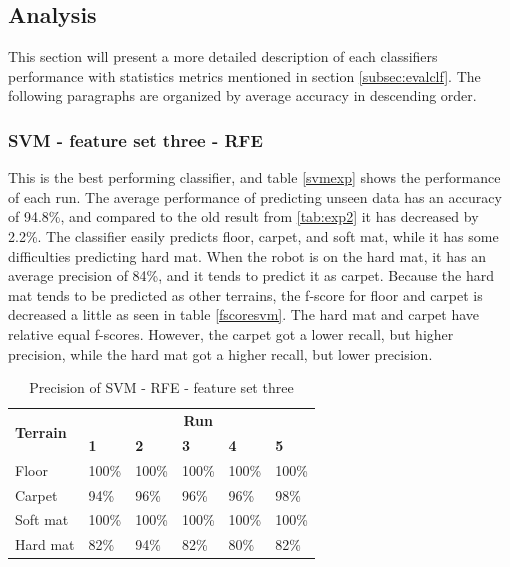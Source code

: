 \documentclass[USenglish]{ifimaster}  %
\begin{document}
\subsection{Analysis}
This section will present a more detailed description of each classifiers performance with statistics metrics mentioned in section \ref{subsec:evalclf}. The following paragraphs are organized by average accuracy in descending order.
\newpage

\subsubsection{SVM - feature set three - RFE} \label{sb:svmwrapper}
This is the best performing classifier, and table \ref{svmexp} shows the performance of each run. The average performance of predicting unseen data has an accuracy of 94.8\%, and compared to the old result from \ref{tab:exp2} it has decreased by 2.2\%. The classifier easily predicts floor, carpet, and soft mat, while it has some difficulties predicting hard mat. When the robot is on the hard mat, it has an average precision of 84\%, and it tends to predict it as carpet. Because the hard mat tends to be predicted as other terrains, the f-score for floor and carpet is decreased a little as seen in table \ref{fscoresvm}. The hard mat and carpet have relative equal f-scores. However, the carpet got a lower recall, but higher precision, while the hard mat got a higher recall, but lower precision.

\begin{table}[h]
	\begin{subtable}[h]{1\textwidth}
		\centering
		\captionsetup{justification=centering}
		\begin{tabular}{@{}llllll@{}}
			\toprule
			\multirow{2}{*}{\textbf{Terrain}} & \multicolumn{5}{c}{\textbf{Run}} \\ \cmidrule(l){2-6} 
			& \multicolumn{1}{l|}{\textbf{1}} & \multicolumn{1}{l|}{\textbf{2}} & \multicolumn{1}{l|}{\textbf{3}} & \multicolumn{1}{l|}{\textbf{4}} & \textbf{5} \\ \midrule
			\multicolumn{1}{l|}{Floor} & \multicolumn{1}{l|}{100\%} & \multicolumn{1}{l|}{100\%} & \multicolumn{1}{l|}{100\%} & \multicolumn{1}{l|}{100\%} & 100\% \\ \midrule
			\multicolumn{1}{l|}{Carpet} & \multicolumn{1}{l|}{94\%} & \multicolumn{1}{l|}{96\%} & \multicolumn{1}{l|}{96\%} & \multicolumn{1}{l|}{96\%} & 98\% \\ \midrule
			\multicolumn{1}{l|}{Soft mat} & \multicolumn{1}{l|}{100\%} & \multicolumn{1}{l|}{100\%} & \multicolumn{1}{l|}{100\%} & \multicolumn{1}{l|}{100\%} & 100\% \\ \midrule
			\multicolumn{1}{l|}{Hard mat} & \multicolumn{1}{l|}{82\%} & \multicolumn{1}{l|}{94\%} & \multicolumn{1}{l|}{82\%} & \multicolumn{1}{l|}{80\%} & 82\% \\ \bottomrule
		\end{tabular}
		\caption{Precision of SVM - RFE - feature set three}
		\label{pressvm}
	\end{subtable}
\end{table}
\end{document}
